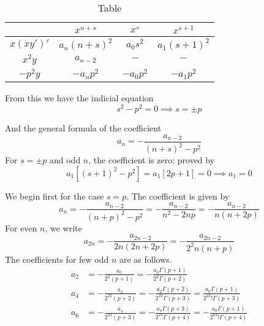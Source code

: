 \documentclass[../main.tex]{subfiles}
\begin{document}
\begin{table}[h]
    \centering
    \caption{Table}
    \begin{tabular}{cccc }
        \toprule
                  & $x^{n+s}$     & $x^s$     & $x^{s+1}$    \\
        \midrule
        $x(xy')'$ & $a_n(n+s)^2 $ & $a_0s^2$  & $a_1(s+1)^2$ \\
        $x^2y $   & $a_{n-2}$     & $- $      & $-$          \\
        $-p^2y$   & $-a_np^2$     & $-a_0p^2$ & $-a_1p^2$    \\
        \bottomrule
    \end{tabular}
\end{table}

From this we have the indicial equation
\begin{equation*}
    s^2-p^2=0\implies s=\pm p
\end{equation*}

And the general formula of the coefficient
\begin{equation*}
    a_n=-\frac{a_{n-2}}{(n+s)^2-p^2}
\end{equation*}
For $s=\pm p$ and odd $n$, the coefficient is zero; proved by
\begin{equation*}
    a_1\left[(s+1)^2-p^2\right]=a_1\left[2p+1\right]=0\implies a_1=0
\end{equation*}

We begin first for the case $s=p$.
The coefficient is given by
\begin{equation*}
    a_n=-\frac{a_{n-2}}{(n+p)^2-p^2}=-\frac{a_{n-2}}{n^2-2np}=-\frac{a_{n-2}}{n(n+2p)}
\end{equation*}
For even $n$, we write
\begin{equation*}
    a_{2n}=-\frac{a_{2n-2}}{2n(2n+2p)}= -\frac{a_{2n-2}}{2^2n(n+p)}
\end{equation*}
The coefficients for few odd $n$ are as follows.
\begin{align*}
    a_2 & =-\frac{a_0}{2^2(p+1)}=-\frac{a_0\Gamma(p+1)}{2^2\Gamma(p+2)}                                            \\
    a_4 & =-\frac{a_2}{2^22(p+2)}=-\frac{a_2\Gamma(p+2)}{2^22\Gamma(p+3)}=\frac{a_0\Gamma(p+1)}{2^42!\Gamma(p+3)}  \\
    a_6 & =-\frac{a_4}{2^23(p+3)}=-\frac{a_4\Gamma(p+3)}{2^23\Gamma(p+4)}=-\frac{a_0\Gamma(p+1)}{2^63!\Gamma(p+4)}
\end{align*}
\end{document}

